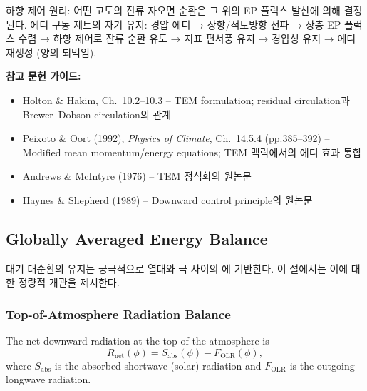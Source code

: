 \begin{hisublock}
하향 제어 원리: 어떤 고도의 잔류 자오면 순환은 그 위의 EP 플럭스 발산에 의해 결정된다.
에디 구동 제트의 자기 유지: 경압 에디 → 상향/적도방향 전파 → 상층 EP 플럭스 수렴 → 하향 제어로 잔류 순환 유도 → 지표 편서풍 유지 → 경압성 유지 → 에디 재생성 (양의 되먹임).
\end{hisublock}


\begin{hisublock}
\textbf{참고 문헌 가이드:}
\begin{itemize}
  \item Holton \& Hakim, Ch.~10.2--10.3 -- TEM formulation; residual circulation과 Brewer--Dobson circulation의 관계
  \item Peixoto \& Oort (1992), \textit{Physics of Climate}, Ch.~14.5.4 (pp.385--392) -- Modified mean momentum/energy equations; TEM 맥락에서의 에디 효과 통합 
  \item Andrews \& McIntyre (1976) -- TEM 정식화의 원논문
  \item Haynes \& Shepherd (1989) -- Downward control principle의 원논문
\end{itemize}
\end{hisublock}


\subsection{Globally Averaged Energy Balance}

대기 대순환의 유지는 궁극적으로 열대와 극 사이의
에 기반한다.
이 절에서는 이에 대한 정량적 개관을 제시한다.

\subsubsection{Top-of-Atmosphere Radiation Balance}

\begin{definition}
The net downward radiation at the top of the atmosphere is
\begin{equation}\label{eq:R_net}
  R_{\text{net}}(\phi) = S_{\text{abs}}(\phi) - F_{\text{OLR}}(\phi),
\end{equation}
where $S_{\text{abs}}$ is the absorbed shortwave (solar) radiation and
$F_{\text{OLR}}$ is the outgoing longwave radiation.
\end{definition}

